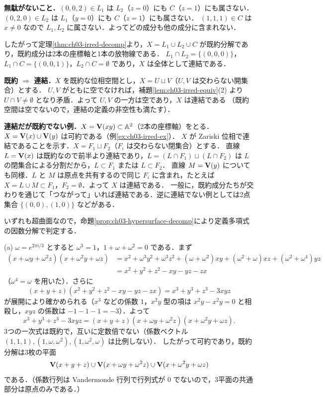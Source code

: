 \textbf{無駄がないこと．}$(0,0,2)\in L_1$ は $L_2$（$z=0$）にも $C$（$z=1$）にも属さない．$(0,2,0)\in L_2$ は $L_1$（$y=0$）にも $C$（$z=1$）にも属さない．
$(1,1,1)\in C$ は $x\ne0$ なので $L_1,L_2$ に属さない．よってどの成分も他の成分に含まれない．

したがって定理\ref{thm:ch03-irred-decomp}より，$X=L_1\cup L_2\cup C$ が既約分解であり，既約成分は2本の座標軸と1本の放物線である．
$L_1\cap L_2=\{(0,0,0)\}$，$L_1\cap C=\{(0,0,1)\}$，$L_2\cap C=\emptyset$ であり，$X$ は全体として連結である．

\textbf{既約 $\Rightarrow$ 連結．}$X$ を既約な位相空間とし，$X=U\sqcup V$（$U,V$ は交わらない開集合）とする．
$U,V$ がともに空でなければ，補題\ref{lem:ch03-irred-equiv}(2) より $U\cap V\ne\emptyset$ となり矛盾．よって $U,V$ の一方は空であり，$X$ は連結である
（既約空間は空でないので，連結の定義の非空性も満たす）．

\textbf{連結だが既約でない例．}$X=\mathbf{V}(xy)\subset\mathbb{A}^2$（2本の座標軸）をとる．$X=\mathbf{V}(x)\cup\mathbf{V}(y)$ は可約である（例\ref{ex:ch03-irred-ex}）．
$X$ が Zariski 位相で連結であることを示す．$X=F_1\sqcup F_2$（$F_i$ は交わらない閉集合）とする．
直線 $L=\mathbf{V}(x)$ は既約なので前半より連結であり，$L=(L\cap F_1)\sqcup(L\cap F_2)$ は $L$ の閉集合による分割だから，$L\subset F_1$ または $L\subset F_2$．
直線 $M=\mathbf{V}(y)$ についても同様．$L$ と $M$ は原点を共有するので同じ $F_i$ に含まれ，たとえば $X=L\cup M\subset F_1$，$F_2=\emptyset$．よって $X$ は連結である．
一般に，既約成分たちが交わりを通じて「つながって」いれば連結である．逆に連結でない例としては2点集合 $\{(0,0),(1,0)\}$ などがある．

いずれも超曲面なので，命題\ref{prop:ch03-hypersurface-decomp}により定義多項式の因数分解で判定する．

(a) $\omega=e^{2\pi i/3}$ とすると $\omega^3=1$，$1+\omega+\omega^2=0$ である．まず
\[
\begin{aligned}
  (x+\omega y+\omega^2z)(x+\omega^2y+\omega z)
  &=x^2+\omega^3y^2+\omega^3z^2+(\omega+\omega^2)xy+(\omega^2+\omega)xz+(\omega^2+\omega^4)yz\\
  &=x^2+y^2+z^2-xy-yz-zx
\end{aligned}
\]
（$\omega^4=\omega$ を用いた）．さらに
\[
  (x+y+z)(x^2+y^2+z^2-xy-yz-zx)=x^3+y^3+z^3-3xyz
\]
が展開により確かめられる（$x^3$ などの係数 $1$，$x^2y$ 型の項は $x^2y-x^2y=0$ と相殺し，$xyz$ の係数は $-1-1-1=-3$）．よって
\[
  x^3+y^3+z^3-3xyz=(x+y+z)(x+\omega y+\omega^2z)(x+\omega^2y+\omega z).
\]
3つの一次式は既約で，互いに定数倍でない（係数ベクトル $(1,1,1),(1,\omega,\omega^2),(1,\omega^2,\omega)$ は比例しない）．
したがって可約であり，既約分解は3枚の平面
\[
  \mathbf{V}(x+y+z)\cup\mathbf{V}(x+\omega y+\omega^2z)\cup\mathbf{V}(x+\omega^2y+\omega z)
\]
である．（係数行列は Vandermonde 行列で行列式が $0$ でないので，3平面の共通部分は原点のみである．）

